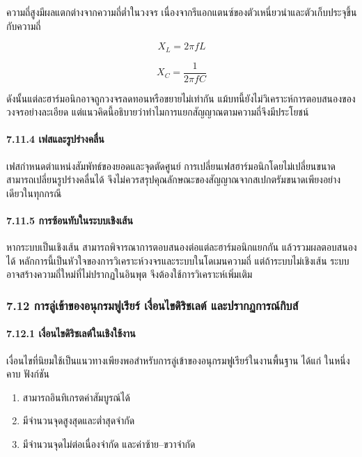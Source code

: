 ความถี่สูงมีผลแตกต่างจากความถี่ต่ำในวงจร เนื่องจากรีแอกแตนซ์ของตัวเหนี่ยวนำและตัวเก็บประจุขึ้นกับความถี่

\[
X_L=2\pi fL
\]

\[
X_C=\frac{1}{2\pi fC}
\]

ดังนั้นแต่ละฮาร์มอนิกอาจถูกวงจรลดทอนหรือขยายไม่เท่ากัน แม้บทนี้ยังไม่วิเคราะห์การตอบสนองของวงจรอย่างละเอียด แต่แนวคิดนี้อธิบายว่าทำไมการแยกสัญญาณตามความถี่จึงมีประโยชน์

\paragraph{7.11.4 เฟสและรูปร่างคลื่น}

เฟสกำหนดตำแหน่งสัมพัทธ์ของยอดและจุดตัดศูนย์ การเปลี่ยนเฟสฮาร์มอนิกโดยไม่เปลี่ยนขนาดสามารถเปลี่ยนรูปร่างคลื่นได้ จึงไม่ควรสรุปคุณลักษณะของสัญญาณจากสเปกตรัมขนาดเพียงอย่างเดียวในทุกกรณี

\paragraph{7.11.5 การซ้อนทับในระบบเชิงเส้น}

หากระบบเป็นเชิงเส้น สามารถพิจารณาการตอบสนองต่อแต่ละฮาร์มอนิกแยกกัน แล้วรวมผลตอบสนองได้ หลักการนี้เป็นหัวใจของการวิเคราะห์วงจรและระบบในโดเมนความถี่ แต่ถ้าระบบไม่เชิงเส้น ระบบอาจสร้างความถี่ใหม่ที่ไม่ปรากฏในอินพุต จึงต้องใช้การวิเคราะห์เพิ่มเติม

\subsubsection{7.12 การลู่เข้าของอนุกรมฟูเรียร์ เงื่อนไขดิริชเลต์ และปรากฏการณ์กิบส์}

\paragraph{7.12.1 เงื่อนไขดิริชเลต์ในเชิงใช้งาน}

เงื่อนไขที่นิยมใช้เป็นแนวทางเพียงพอสำหรับการลู่เข้าของอนุกรมฟูเรียร์ในงานพื้นฐาน ได้แก่ ในหนึ่งคาบ ฟังก์ชัน

\begin{enumerate}
\def\labelenumi{\arabic{enumi}.}
\item
  สามารถอินทิเกรตค่าสัมบูรณ์ได้
\item
  มีจำนวนจุดสูงสุดและต่ำสุดจำกัด
\item
  มีจำนวนจุดไม่ต่อเนื่องจำกัด และค่าซ้าย--ขวาจำกัด
\end{enumerate}

